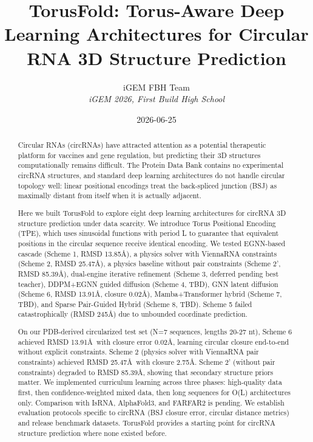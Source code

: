 
\
\
\
\
\
\
\
\
\
\
\

\

\

\title{TorusFold: Torus-Aware Deep Learning Architectures for Circular RNA 3D Structure Prediction}

\author{
iGEM FBH Team\\
\textit{iGEM 2026, First Build High School}
}

\date{2026-06-25}



\

\begin{abstract}
Circular RNAs (circRNAs) have attracted attention as a potential therapeutic platform for vaccines and gene regulation, but predicting their 3D structures computationally remains difficult. The Protein Data Bank contains no experimental circRNA structures, and standard deep learning architectures do not handle circular topology well: linear positional encodings treat the back-spliced junction (BSJ) as maximally distant from itself when it is actually adjacent.

Here we built TorusFold to explore eight deep learning architectures for circRNA 3D structure prediction under data scarcity. We introduce Torus Positional Encoding (TPE), which uses sinusoidal functions with period L to guarantee that equivalent positions in the circular sequence receive identical encoding. We tested EGNN-based cascade (Scheme 1, RMSD 13.85\AA), a physics solver with ViennaRNA constraints (Scheme 2, RMSD 25.47\AA), a physics baseline without pair constraints (Scheme 2', RMSD 85.39\AA), dual-engine iterative refinement (Scheme 3, deferred pending best teacher), DDPM+EGNN guided diffusion (Scheme 4, TBD), GNN latent diffusion (Scheme 6, RMSD 13.91\AA, closure 0.02\AA), Mamba+Transformer hybrid (Scheme 7, TBD), and Sparse Pair-Guided Hybrid (Scheme 8, TBD). Scheme 5 failed catastrophically (RMSD 245\AA) due to unbounded coordinate prediction.

On our PDB-derived circularized test set (N=7 sequences, lengths 20-27 nt), Scheme 6 achieved RMSD 13.91\AA\ with closure error 0.02\AA, learning circular closure end-to-end without explicit constraints. Scheme 2 (physics solver with ViennaRNA pair constraints) achieved RMSD 25.47\AA\ with closure 2.75\AA. Scheme 2' (without pair constraints) degraded to RMSD 85.39\AA, showing that secondary structure priors matter. We implemented curriculum learning across three phases: high-quality data first, then confidence-weighted mixed data, then long sequences for O(L) architectures only. Comparison with IsRNA, AlphaFold3, and FARFAR2 is pending. We establish evaluation protocols specific to circRNA (BSJ closure error, circular distance metrics) and release benchmark datasets. TorusFold provides a starting point for circRNA structure prediction where none existed before.
\end{abstract}

